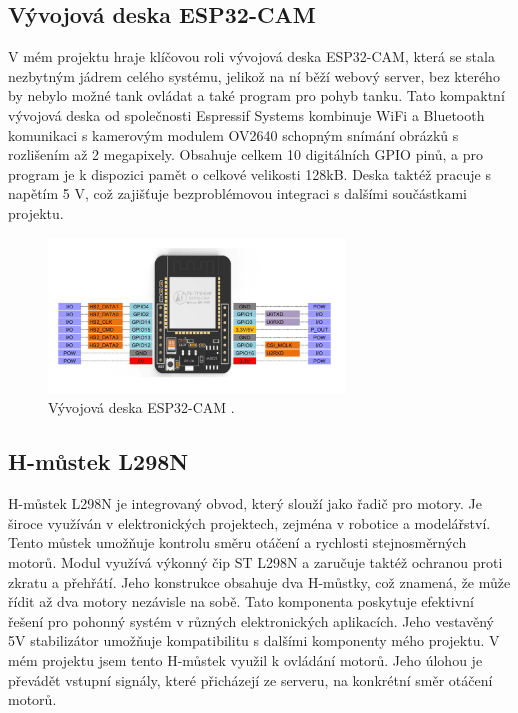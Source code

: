 \documentclass[12pt, a4paper,
oneside
openany
]{report}
\begin{document}
\subsection{Vývojová deska ESP32-CAM}
\noindent V mém projektu hraje klíčovou roli vývojová deska ESP32-CAM, která se stala nezbytným jádrem celého systému, jelikož na ní běží webový server, bez kterého by nebylo možné tank ovládat a také program pro pohyb tanku. Tato kompaktní vývojová deska od společnosti Espressif Systems kombinuje WiFi a Bluetooth komunikaci s kamerovým modulem OV2640 schopným snímání obrázků s rozlišením až 2 megapixely. Obsahuje celkem 10 digitálních GPIO pinů, a pro program je k dispozici pamět o celkové velikosti 128kB. Deska taktéž pracuje s napětím 5 V, což zajišťuje bezproblémovou integraci s dalšími součástkami projektu. 

	\begin{figure}[ht]
		\centering 
		\includegraphics[width=0.7\textwidth]{image/esp-detail} %
		\caption{Vývojová deska ESP32-CAM \cite{ESP32}.} 
	\end{figure}

\subsection{H-můstek L298N}
\noindent H-můstek L298N je integrovaný obvod, který slouží jako řadič pro motory. Je široce využíván v elektronických projektech, zejména v robotice a modelářství. Tento můstek umožňuje kontrolu směru otáčení a rychlosti stejnosměrných motorů. Modul využívá výkonný čip ST L298N a zaručuje taktéž ochranou proti zkratu a přehřátí. Jeho konstrukce obsahuje dva H-můstky, což znamená, že může řídit až dva motory nezávisle na sobě. Tato komponenta poskytuje efektivní řešení pro pohonný systém v různých elektronických aplikacích. Jeho vestavěný 5V stabilizátor umožňuje kompatibilitu s dalšími komponenty mého projektu. V mém projektu jsem tento H-můstek využil k ovládání motorů. Jeho úlohou je převádět vstupní signály, které přicházejí ze serveru, na konkrétní směr otáčení motorů.
\end{document}
